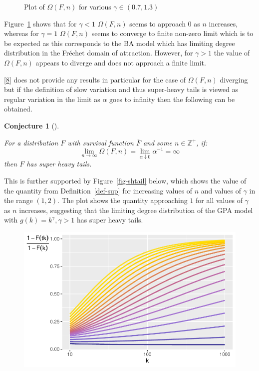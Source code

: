 \documentclass[
  10pt,
  a4paper,
]{scrreprt}
\theoremstyle{definition}
\theoremstyle{plain}
\theoremstyle{plain}
\newtheorem{conjecture}{Conjecture}[section]
\theoremstyle{remark}
\begin{document}
{\begin{figure}[H]
{}

\caption{\label{fig-omega}Plot of \(\Omega(F,n)\) for various
\(\gamma \in (0.7,1.3)\)}

\end{figure}

Figure~\ref{fig-omega} shows that for \(\gamma<1\) \(\Omega(F,n)\) seems
to approach 0 as \(n\) increases, whereas for \(\gamma=1\)
\(\Omega(F,n)\) seems to converge to finite non-zero limit which is to
be expected as this corresponds to the BA model which has limiting
degree distribution in the Fréchet domain of attraction. However, for
\(\gamma>1\) the value of \(\Omega(F,n)\) appears to diverge and does
not approach a finite limit.

{[}\protect\hyperlink{ref-shimura12}{8}{]} does not provide any results
in particular for the case of \(\Omega(F,n)\) diverging but if the
definition of slow variation and thus super-heavy tails is viewed as
regular variation in the limit as \(\alpha\) goes to infinity then the
following can be obtained.

\begin{conjecture}[]\protect\hypertarget{cnj-omg}{}\label{cnj-omg}

For a distribution \(F\) with survival function \(\overline F\) and some
\(n\in\mathbb Z^+\), if: \[
\lim_{n\rightarrow\infty} \Omega(F,n) = \lim_{\alpha\downarrow0} \alpha^{-1} = \infty
\] then \(F\) has super heavy tails.

\end{conjecture}

This is further supported by Figure~\ref{fig-shtail} below, which shows
the value of the quantity from Definition~\ref{def-sup} for increasing
values of \(n\) and values of \(\gamma\) in the range \((1,2)\). The
plot shows the quantity approaching \(1\) for all values of \(\gamma\)
as \(n\) increases, suggesting that the limiting degree distribution of
the GPA model with \(g(k) = k^\gamma,\gamma>1\) has super heavy tails.

\begin{figure}[H]

{\centering \includegraphics{doc_files/figure-pdf/fig-shtail-1.pdf}

}
\end{figure}}
\end{document}
